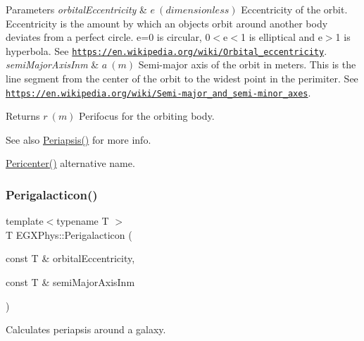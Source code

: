 \begin{DoxyParams}{Parameters}
{\em orbital\+Eccentricity} & $ e\ (dimensionless)$ Eccentricity of the orbit. Eccentricity is the amount by which an objects orbit around another body deviates from a perfect circle. e=0 is circular, 0$<$e$<$1 is elliptical and e$>$1 is hyperbola. See \href{https://en.wikipedia.org/wiki/Orbital_eccentricity}{\tt https\+://en.\+wikipedia.\+org/wiki/\+Orbital\+\_\+eccentricity}. \\
\hline
{\em semi\+Major\+Axis\+Inm} & $ a\ (m)$ Semi-\/major axis of the orbit in meters. This is the line segment from the center of the orbit to the widest point in the perimiter. See \href{https://en.wikipedia.org/wiki/Semi-major_and_semi-minor_axes}{\tt https\+://en.\+wikipedia.\+org/wiki/\+Semi-\/major\+\_\+and\+\_\+semi-\/minor\+\_\+axes}. \\
\hline
\end{DoxyParams}
\begin{DoxyReturn}{Returns}
$ r\ (m)$ Perifocus for the orbiting body. 
\end{DoxyReturn}
\begin{DoxySeeAlso}{See also}
\mbox{\hyperlink{group___e_g_x_phys-_periapsis_gad487212733711bc2ce73c8137c9309c3}{Periapsis()}} for more info. 

\mbox{\hyperlink{group___e_g_x_phys-_periapsis_gaa769950fdad108083236bb0efded1196}{Pericenter()}} alternative name. 
\end{DoxySeeAlso}
\mbox{\label{group___e_g_x_phys-_periapsis_ga05df9ab5aa8e1efa938f740b894ade25}} 
\subsubsection{\texorpdfstring{Perigalacticon()}{Perigalacticon()}}
{\footnotesize\ttfamily template$<$typename T $>$ \\
T E\+G\+X\+Phys\+::\+Perigalacticon (\begin{DoxyParamCaption}\item[{const T \&}]{orbital\+Eccentricity,  }\item[{const T \&}]{semi\+Major\+Axis\+Inm }\end{DoxyParamCaption})}



Calculates periapsis around a galaxy. 


